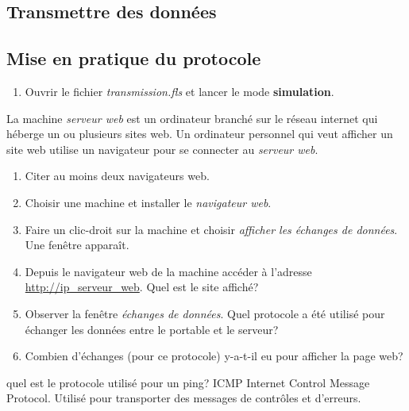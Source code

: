 \documentclass[a4paper,11pt]{article}
\begin{document}
\begin{Form}
\section{Transmettre des données}
\subsection{Mise en pratique du protocole}
\begin{activite}
\begin{enumerate}
\item Ouvrir le fichier \emph{transmission.fls} et lancer le mode \textbf{simulation}.
\end{enumerate}
La machine \emph{serveur web} est un ordinateur branché sur le réseau internet qui héberge un ou plusieurs sites web. Un ordinateur personnel qui veut afficher un site web utilise un navigateur pour se connecter au \emph{serveur web}.
\begin{enumerate}[resume]
\item Citer au moins deux navigateurs web.
\item Choisir une machine et installer le \emph{navigateur web}.
\item Faire un clic-droit sur la machine et choisir \emph{afficher les échanges de données}. Une fenêtre apparaît.
\item Depuis le navigateur web de la machine accéder à l'adresse \url{http://ip\_serveur\_web}. Quel est le site affiché?
\item Observer la fenêtre \emph{échanges de données}. Quel protocole a été utilisé pour échanger les données entre le portable et le serveur?
\item Combien d'échanges (pour ce protocole) y-a-t-il eu pour afficher la page web?
\end{enumerate}
\begin{commentprof}
quel est le protocole utilisé pour un ping? ICMP Internet Control Message Protocol. Utilisé pour transporter des messages de contrôles et d'erreurs.
\end{commentprof}
\end{activite}

\end{Form}
\end{document}
